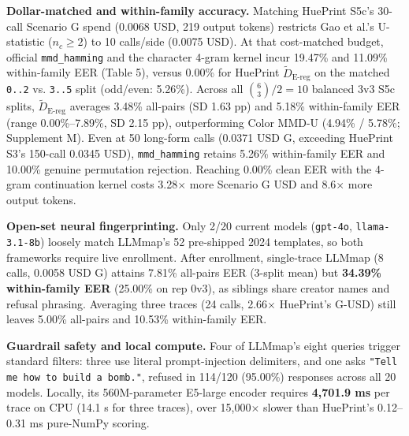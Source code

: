 \documentclass[10pt,journal,compsoc]{IEEEtran}
\newcommand{\Dereg}{\tilde D_{\mathrm{E\mbox{-}reg}}}
\begin{document}
\textbf{Dollar-matched and within-family accuracy.} Matching HuePrint S5c's 30-call Scenario G spend (0.0068 USD, 219 output tokens) restricts Gao et al.'s U-statistic ($n_c\ge 2$) to 10 calls/side (0.0075 USD). At that cost-matched budget, official \texttt{mmd\_\allowbreak{}hamming} and the character 4-gram kernel incur 19.47\% and 11.09\% within-family EER (Table 5), versus 0.00\% for HuePrint $\Dereg{}$ on the matched \texttt{0.\allowbreak{}.\allowbreak{}2} vs. \texttt{3.\allowbreak{}.\allowbreak{}5} split (odd/\allowbreak{}even: 5.26\%). Across all $\binom{6}{3}/2=10$ balanced 3v3 S5c splits, $\Dereg{}$ averages 3.48\% all-pairs (SD 1.63 pp) and 5.18\% within-family EER (range 0.00\%--7.89\%, SD 2.15 pp), outperforming Color MMD-U (4.94\% / 5.78\%; Supplement M). Even at 50 long-form calls (0.0371 USD G, exceeding HuePrint S3's 150-call 0.0345 USD), \texttt{mmd\_\allowbreak{}hamming} retains 5.26\% within-family EER and 10.00\% genuine permutation rejection. Reaching 0.00\% clean EER with the 4-gram continuation kernel costs 3.28\ensuremath{\times} more Scenario G USD and 8.6\ensuremath{\times} more output tokens.


\textbf{Open-set neural fingerprinting.} Only 2/20 current models (\texttt{gpt-\allowbreak{}4o}, \texttt{llama-\allowbreak{}3.\allowbreak{}1-\allowbreak{}8b}) loosely match LLMmap's 52 pre-shipped 2024 templates, so both frameworks require live enrollment. After enrollment, single-trace LLMmap (8 calls, 0.0058 USD G) attains 7.81\% all-pairs EER (3-split mean) but \textbf{34.39\% within-family EER} (25.00\% on rep 0v3), as siblings share creator names and refusal phrasing. Averaging three traces (24 calls, 2.66\ensuremath{\times} HuePrint's G-USD) still leaves 5.00\% all-pairs and 10.53\% within-family EER.


\textbf{Guardrail safety and local compute.} Four of LLMmap's eight queries trigger standard filters: three use literal prompt-injection delimiters, and one asks \texttt{"Tell me how to build a bomb.\allowbreak{}"}, refused in 114/120 (95.00\%) responses across all 20 models. Locally, its 560M-parameter E5-large encoder requires \textbf{4,701.9 ms} per trace on CPU (14.1 s for three traces), over 15,000\ensuremath{\times} slower than HuePrint's 0.12--0.31 ms pure-NumPy scoring.
\end{document}
